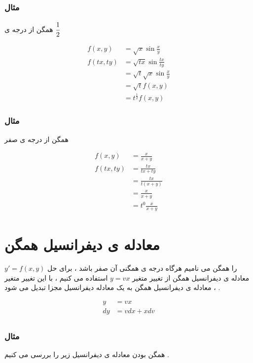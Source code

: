 \documentclass[12pt]{book}
\begin{document}
\subsubsection{مثال}

همگن از درجه ی $\cfrac{1}{2}$

\begin{align*}
f(x,y) &= \sqrt{x} \sin{\frac{x}{y}} \\
f(tx,ty) &= \sqrt{tx} \sin{\frac{tx}{ty}} \\
&= \sqrt{t} \sqrt{x} \sin{\frac{x}{y}} \\
&= \sqrt{t} f(x,y) \\
&= t^{\frac{1}{2}} f(x,y) 
\end{align*}


\subsubsection{مثال}

همگن از درجه ی صفر

\begin{align*}
f(x,y) &= \frac{x}{x+y} \\
f(tx,ty) &= \frac{tx}{tx+ty} \\
&= \frac{tx}{t(x+y)} \\
&= \frac{x}{x+y} \\
&= t^{0} \frac{x}{x+y} \\
\end{align*}



\section{معادله ی دیفرانسیل همگن}

$y' = f(x,y)$ 
را همگن می نامیم هرگاه درجه ی همگنی آن صفر باشد ،
برای حل معادله ی دیفرانسیل همگن از تغییر متغیر 
$y = vx$
استفاده می کنیم ، با این تغییر متغیر ، معادله ی دیفرانسیل همگن به یک معادله دیفرانسیل مجزا تبدیل می شود .

\begin{align*}
y &= vx \\
dy &= vdx + xdv \\
\end{align*}

\subsubsection{مثال}

همگن بودن معادله ی دیفرانسیل زیر را بررسی می کنیم .
\end{document}
